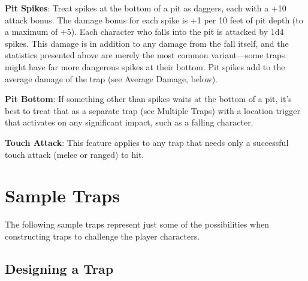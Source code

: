 \textbf{Pit Spikes}: Treat spikes at the bottom of a pit as daggers, each with a +10 attack bonus. The damage bonus for each spike is +1 per 10 feet of pit depth (to a maximum of +5). Each character who falls into the pit is attacked by 1d4 spikes. This damage is in addition to any damage from the fall itself, and the statistics presented above are merely the most common variant---some traps might have far more dangerous spikes at their bottom. Pit spikes add to the average damage of the trap (see Average Damage, below).
				
\textbf{Pit Bottom}: If something other than spikes waits at the bottom of a pit, it's best to treat that as a separate trap (see Multiple Traps) with a location trigger that activates on any significant impact, such as a falling character. 
				
\textbf{Touch Attack}: This feature applies to any trap that needs only a successful touch attack (melee or ranged) to hit.
				
\section{Sample Traps}

				
The following sample traps represent just some of the possibilities when constructing traps to challenge the player characters.



\subsection{Designing a Trap}

